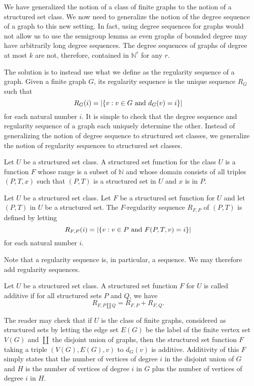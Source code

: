 \documentclass[review]{elsarticle}
\begin{document}
We have generalized the notion of a class of finite graphs
to the notion of a structured set class. We now need to
generalize the notion of the degree sequence of a graph to
this new setting. In fact, using degree sequences for graphs
would not allow us to use the semigroup lemma as even graphs
of bounded degree may have arbitrarily long degree sequences.
The degree sequences of graphs of degree at most $k$ are not,
therefore, contained in $\mathbb{N}^r$ for any $r$.

The solution is to instead use what we define as the regularity
sequence of a graph. Given a finite graph $G$, its regularity
sequence is the unique sequence $R_G$ such that
$$R_G(i)=|\{v:v\in G\hbox{ and }d_G(v)=i\}|$$
for each natural number $i$. It is simple to check that the degree
sequence and regularity sequence of a graph each uniquely
determine the other. Instead of generalizing the notion of
degree sequence to structured set classes, we generalize the
notion of regularity sequences to structured set classes.

\begin{dfn}
Let $U$ be a structured set class. 
A structured set function for the class $U$ is a function $F$
whose range is a subset of $\mathbb{N}$ and
whose domain consists of all triples $(P,T,x)$ such that
$(P,T)$ is a structured set in $U$ and $x$ is in $P$.
\end{dfn}

\begin{dfn}
Let $U$ be a structured set class.
Let $F$ be a structured set function for $U$ and
let $(P,T)$ in $U$ be a structured set.
The $F$-regularity sequence $R_{F,P}$ of $(P,T)$
is defined by letting
$$R_{F,P}(i)=|\{v:v\in P\hbox{ and }F(P,T,v)=i\}|$$
 for each natural number $i$.
\end{dfn}

Note that a regularity sequence is, in particular, a sequence.
We may therefore add regularity sequences.

\begin{dfn}
Let $U$ be a structured set class.
A structured set function $F$ for $U$ is called additive if for all
structured sets $P$ and $Q$, we have
$$R_{F,P\coprod Q}=R_{F,P}+R_{F,Q}.$$
\end{dfn}

The reader may check that if $U$ is the class of finite graphs,
considered as structured sets by letting
the edge set $E(G)$ be the label of
the finite vertex set $V(G)$ and $\coprod$ the disjoint union of graphs,
then the structured set function $F$ taking a triple
$(V(G),E(G),v)$ to $d_G(v)$ is additive.
Additivity
of this $F$ simply states that the number of vertices of degree $i$
in the disjoint union of $G$ and $H$ is the number of vertices of
degree $i$ in $G$ plus the number of vertices of degree $i$ in $H$.
\end{document}
